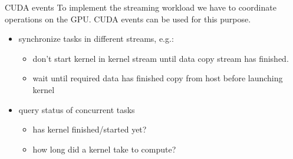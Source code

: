 \begin{frame}[fragile]{}
    \begin{info}{CUDA events}
        To implement the streaming workload we have to coordinate operations on the GPU.
        CUDA events can be used for this purpose.
        \begin{itemize}
            \item synchronize tasks in different streams, e.g.:
            \begin{itemize}
                \item don't start kernel in kernel stream until data copy stream has finished.
                \item wait until required data has finished copy from host before launching kernel
            \end{itemize}
            \item query status of concurrent tasks
            \begin{itemize}
                \item has kernel finished/started yet?
                \item how long did a kernel take to compute?
            \end{itemize}
        \end{itemize}
    \end{info}
\end{frame}

